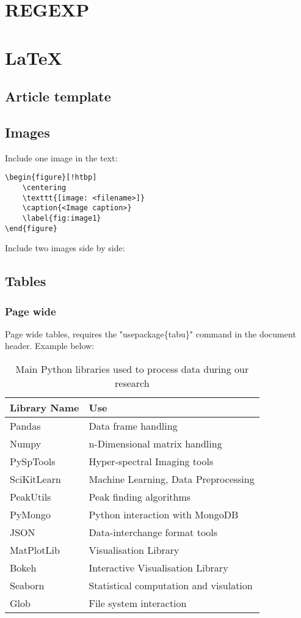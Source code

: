 \documentclass[12pt,a4paper]{article}
\begin{document}
\section{REGEXP}


\section{LaTeX}
\subsection{Article template}


\subsection{Images}
Include one image in the text:
\begin{center}
\begin{lstlisting}
\begin{figure}[!htbp]
	\centering
	\texttt{[image: <filename>]}
	\caption{<Image caption>}
	\label{fig:image1}
\end{figure}
\end{lstlisting}
\end{center}
Include two images side by side:
\newpage

\subsection{Tables}

\subsubsection{Page wide}
Page wide tables, requires the "usepackage\{tabu\}" command in the document
header. Example below:

\begin{center}
\begin{table}[!htbp]
\begin{tabu}{ X[l] X[r] }
	\hline
 Library Name& Use\\
 	\hline
 	\hline
 Pandas & Data frame handling\\
 Numpy & n-Dimensional matrix handling\\
 PySpTools & Hyper-spectral Imaging tools\\
 SciKitLearn &  Machine Learning, Data Preprocessing\\
 PeakUtils & Peak finding algorithms\\
 PyMongo & Python interaction with MongoDB\\
 JSON & Data-interchange format tools\\
 MatPlotLib & Visualisation Library\\
 Bokeh & Interactive Visualisation Library\\
 Seaborn & Statistical computation and visulation\\
 Glob & File system interaction\\
  	\hline
\end{tabu}
\caption{Main Python libraries used to process data during our research}
\label{table:pythonlib}
\end{table}
\end{center}
\end{document}

